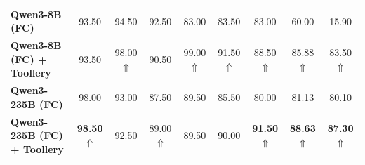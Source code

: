 \begin{table}[htb]
{\begin{tabular}{lcccccccc}
\textbf{Qwen3-8B (FC)}                      & 93.50 & 94.50 & 92.50 & 83.00 & 83.50  & 83.00 & 60.00 & 15.90            \\
\textbf{Qwen3-8B (FC) + Toollery}           & 93.50 & 98.00 $\Uparrow$ & 90.50 & 99.00 $\Uparrow$ & 91.50 $\Uparrow$  & 88.50 $\Uparrow$ & 85.88 $\Uparrow$ & 83.50 $\Uparrow$            \\ \hline
\textbf{Qwen3-235B (FC)}                    & 98.00 & 93.00 & 87.50 & 89.50 & 85.50 & 80.00 & 81.13 & 80.10            \\
\textbf{Qwen3-235B (FC) + Toollery}         & \textbf{98.50} $\Uparrow$ & 92.50 & 89.00 $\Uparrow$ & 89.50 & 90.00  & \textbf{91.50} $\Uparrow$ & \textbf{88.63} $\Uparrow$ & \textbf{87.30} $\Uparrow$             \\ \hline \hline
\end{tabular}
}
\vskip -0.1in
\end{table}